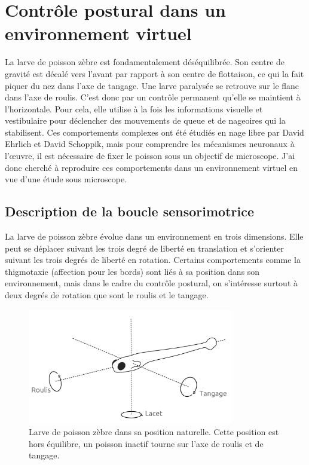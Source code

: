 \chapter{Contrôle postural dans un environnement virtuel}

La larve de poisson zèbre est fondamentalement déséquilibrée. Son centre de gravité est décalé vers l'avant par rapport à son centre de flottaison, ce qui la fait piquer du nez dans l'axe de tangage. Une larve paralysée se retrouve sur le flanc dans l'axe de roulis. C'est donc par un contrôle permanent qu'elle se maintient à l'horizontale. Pour cela, elle utilise à la fois les informations visuelle et vestibulaire pour déclencher des mouvements de queue et de nageoires qui la stabilisent. Ces comportements complexes ont été étudiés en nage libre par David Ehrlich et David Schoppik, mais pour comprendre les mécanismes neuronaux à l'œuvre, il est nécessaire de fixer le poisson sous un objectif de microscope. J'ai donc cherché à reproduire ces comportements dans un environnement virtuel en vue d'une étude sous microscope.

\section{Description de la boucle sensorimotrice}

La larve de poisson zèbre évolue dans un environnement en trois dimensions. Elle peut se déplacer suivant les trois degré de liberté en translation et s'orienter suivant les trois degrés de liberté en rotation. Certains comportements comme la thigmotaxie (affection pour les bords) sont liés à sa position dans son environnement, mais dans le cadre du contrôle postural, on s'intéresse surtout à deux degrés de rotation que sont le roulis et le tangage.

\begin{figure}
\centering
\includegraphics[width=0.8\textwidth]{./files/fish.png}
\caption{Larve de poisson zèbre dans sa position naturelle. Cette position est hors équilibre, un poisson inactif tourne sur l'axe de roulis et de tangage.}
\end{figure}

